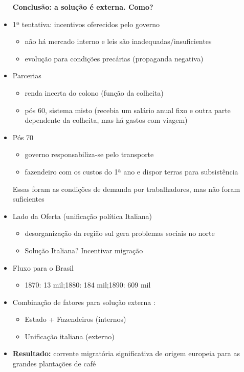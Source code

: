 \documentclass[a4paper,12pt]{article}[abntex2]
\begin{document}
\begin{itemize}
\textbf{Conclusão: a solução é externa. Como?}

\item 1ª tentativa: incentivos oferecidos pelo governo
\begin{itemize}
    \item não há mercado interno e leis são inadequadas/insuficientes
\end{itemize}
\begin{itemize}
    \item evolução para condições precárias (propaganda negativa)
\end{itemize}
\item Parcerias
\begin{itemize}
    \item renda incerta do colono (função da colheita)
\end{itemize}
\begin{itemize}
    \item pós 60, sistema misto (recebia um salário anual fixo e outra parte dependente da colheita, mas há gastos com viagem)
\end{itemize}
\item Pós 70
\begin{itemize}
    \item  governo responsabiliza-se pelo transporte
\end{itemize}
\begin{itemize}
    \item fazendeiro com os custos do 1ª ano e dispor terras para subsistência
\end{itemize}

Essas foram as condições de demanda por trabalhadores, mas não foram suficientes
\item Lado da Oferta (unificação política Italiana)
\begin{itemize}
    \item desorganização da região sul gera problemas sociais no norte
\end{itemize}
\begin{itemize}
    \item Solução Italiana? Incentivar migração
\end{itemize}
\item Fluxo para o Brasil
\begin{itemize}
    \item 1870: 13 mil;1880: 184 mil;1890: 609 mil
\end{itemize}
\item Combinação de fatores para solução externa :
\begin{itemize}
    \item Estado + Fazendeiros (internos)
\end{itemize}
\begin{itemize}
    \item Unificação italiana (externo)
\end{itemize}
\item \textbf{Resultado:} corrente migratória significativa de origem europeia para as grandes plantações de café
\end{itemize}
\end{document}

